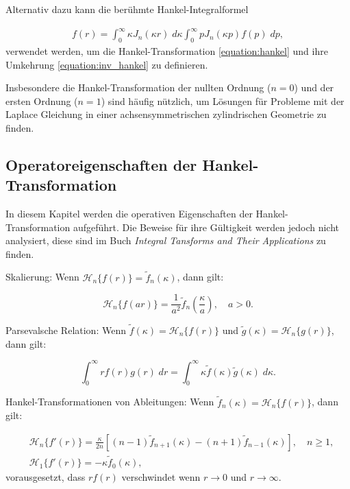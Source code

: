 Alternativ dazu kann die berühmte Hankel-Integralformel 

\begin{align*}
	f(r) = \int_{0}^{\infty}\kappa J_n(\kappa r) \; d\kappa \int_{0}^{\infty} p J_n(\kappa p)f(p) \; dp,
	\label{equation:hankel_integral_formula}
\end{align*}
verwendet werden, um die Hankel-Transformation \eqref{equation:hankel} und ihre Umkehrung \eqref{equation:inv_hankel} zu definieren.

Insbesondere die Hankel-Transformation der nullten Ordnung ($n=0$) und der ersten Ordnung ($n=1$) sind häufig nützlich, um Lösungen für Probleme mit der Laplace Gleichung in einer achsensymmetrischen zylindrischen Geometrie zu finden.

\subsection{Operatoreigenschaften der Hankel-Transformation \label{sub:op_properties_hankel}}
In diesem Kapitel werden die operativen Eigenschaften der Hankel-Transformation aufgeführt. Die Beweise für ihre Gültigkeit werden jedoch nicht analysiert, diese sind im Buch \textit{Integral Tansforms and Their Applications} \cite{lokenath_debnath_integral_2015} zu finden.

\begin{satz}{Skalierung:}
	Wenn $\mathscr{H}_n\{f(r)\}=\tilde{f}_n(\kappa)$, dann gilt:
	
	\begin{equation*}
		\mathscr{H}_n\{f(ar)\}=\frac{1}{a^{2}}\tilde{f}_n \left(\frac{\kappa}{a}\right), \quad a>0.
	\end{equation*}
\end{satz}

\begin{satz}{Parsevalsche Relation:}
Wenn $\tilde{f}(\kappa)=\mathscr{H}_n\{f(r)\}$ und $\tilde{g}(\kappa)=\mathscr{H}_n\{g(r)\}$, dann gilt:

\begin{equation*}
	\int_{0}^{\infty}rf(r)g(r) \; dr = \int_{0}^{\infty}\kappa\tilde{f}(\kappa)\tilde{g}(\kappa) \; d\kappa.
\end{equation*}
\end{satz}

\begin{satz}{Hankel-Transformationen von Ableitungen:}
Wenn $\tilde{f}_n(\kappa)=\mathscr{H}_n\{f(r)\}$, dann gilt:

\begin{align*}
	&\mathscr{H}_n\{f'(r)\}=\frac{\kappa}{2n}\left[(n-1)\tilde{f}_{n+1}(\kappa)-(n+1)\tilde{f}_{n-1}(\kappa)\right], \quad n\geq1, \\
	&\mathscr{H}_1\{f'(r)\}=-\kappa \tilde{f}_0(\kappa),
\end{align*}
vorausgesetzt, dass $rf(r)$ verschwindet wenn $r\to0$ und $r\to\infty$.
\end{satz}

